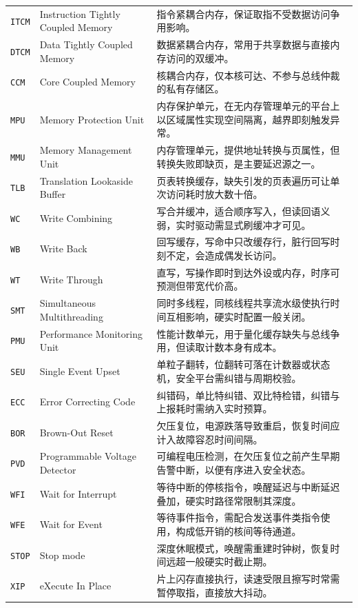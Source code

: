 \documentclass[12pt,a4paper,fontset=fandol]{ctexbook}
\newcommand{\Tp}[1]{\texttt{#1}}
\begin{document}
\begin{longtable}{@{} >{\raggedright\arraybackslash}p{} >{\raggedright\arraybackslash}p{} >{\raggedright\arraybackslash}p{}@{}}
\Tp{ITCM} & Instruction Tightly Coupled Memory & 指令紧耦合内存，保证取指不受数据访问争用影响。 \\
\Tp{DTCM} & Data Tightly Coupled Memory & 数据紧耦合内存，常用于共享数据与直接内存访问的双缓冲。 \\
\Tp{CCM} & Core Coupled Memory & 核耦合内存，仅本核可达、不参与总线仲裁的私有存储区。 \\
\Tp{MPU} & Memory Protection Unit & 内存保护单元，在无内存管理单元的平台上以区域属性实现空间隔离，越界即刻触发异常。 \\
\Tp{MMU} & Memory Management Unit & 内存管理单元，提供地址转换与页属性，但转换失败即缺页，是主要延迟源之一。 \\
\Tp{TLB} & Translation Lookaside Buffer & 页表转换缓存，缺失引发的页表遍历可让单次访问耗时放大数十倍。 \\
\Tp{WC} & Write Combining & 写合并缓冲，适合顺序写入，但读回语义弱，实时驱动需显式刷缓冲才可见。 \\
\Tp{WB} & Write Back & 回写缓存，写命中只改缓存行，脏行回写时刻不定，会造成偶发长访问。 \\
\Tp{WT} & Write Through & 直写，写操作即时到达外设或内存，时序可预测但带宽代价高。 \\
\Tp{SMT} & Simultaneous Multithreading & 同时多线程，同核线程共享流水级使执行时间互相影响，硬实时配置一般关闭。 \\
\Tp{PMU} & Performance Monitoring Unit & 性能计数单元，用于量化缓存缺失与总线争用，但读取计数本身有成本。 \\
\Tp{SEU} & Single Event Upset & 单粒子翻转，位翻转可落在计数器或状态机，安全平台需纠错与周期校验。 \\
\Tp{ECC} & Error Correcting Code & 纠错码，单比特纠错、双比特检错，纠错与上报耗时需纳入实时预算。 \\
\Tp{BOR} & Brown-Out Reset & 欠压复位，电源跌落导致重启，恢复时间应计入故障容忍时间间隔。 \\
\Tp{PVD} & Programmable Voltage Detector & 可编程电压检测，在欠压复位之前产生早期告警中断，以便有序进入安全状态。 \\
\Tp{WFI} & Wait for Interrupt & 等待中断的停核指令，唤醒延迟与中断延迟叠加，硬实时路径常限制其深度。 \\
\Tp{WFE} & Wait for Event & 等待事件指令，需配合发送事件类指令使用，构成低开销的核间等待通道。 \\
\Tp{STOP} & Stop mode & 深度休眠模式，唤醒需重建时钟树，恢复时间远超一般硬实时截止期。 \\
\Tp{XIP} & eXecute In Place & 片上闪存直接执行，读速受限且擦写时常需暂停取指，直接放大抖动。 \\

\end{longtable}
\end{document}
